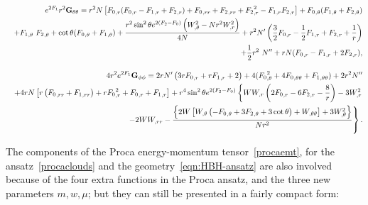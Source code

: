 \begin{eqnarray}
&&  e^{2F_1}r^2{\bf G_{\theta\theta}}=r^2 N\left[ {F_0}_{,r}({F_0}_{,r}- 
{F_1}_{,r}+{F_2}_{,r}) + {F_0}_{,rr}+
{F_2}_{,rr}+ {F_2}_{,r}^2-{F_1}_{,r} {F_2}_{,r} \right]
%
+{F_0}_{,\theta}( {F_1}_{,\theta}+ 
{F_2}_{,\theta})
%
 \nonumber \\
&&
+{F_1}_{,\theta} \
{F_2}_{,\theta}
+\cot \theta( {F_0}_{,\theta}+ {F_1}_{,\theta})+\frac{r^2 \sin ^2\theta 
 e^{2( {F_2}- {F_0})}\left(W_{,\theta}^2-Nr^2  W_{,r}^2\right)}{4 N}+r^2 N' \left(\frac{3}{2} {F_0}_{,r}-\frac{1}{2}  {F_1}_{,r}+
{F_2}_{,r}+\frac{1}{r}\right)
 \nonumber \\
&&
+\frac{1}{2} r^2 \
N''
+r N(
{F_0}_{,r}-
{F_1}_{,r}+2 {F_2}_{,r}),
\end{eqnarray}



\begin{eqnarray}
&& 4r^2e^{2F_1}{\bf G_{\phi\phi}}= 2 r N'  \left(3 r {F_0}_{,r}+r 
{F_1}_{,r}+2\right)+4 (
{F_0}_{,\theta}^2  +4{F_0}_{,\theta\theta}+ {F_1}_{,\theta\theta}) +2 r^2 N''  \nonumber \\
%
&& 
%
+4 r N  \left[r \left({F_0}_{,rr}+{F_1}_{,rr}\right)+r 
{F_0}_{,r}^2+{F_0}_{,r}+{F_1}_{,r}\right] +r^4 \sin ^2\theta e^{2 ({F_2}-F_0)}\left\{ W W_{,r}\left(2  {F_0}_{,r}-6 {F_2}_{,r}-\frac{8}{r}\right)-3  W_{,r}^2\right. \nonumber \\
%
&&
\left.-2 WW_{,rr}- \frac{\left\{2 W \left[W_{,\theta} \left(- {F_0}_{,\theta}
+3 {F_2}_{,\theta}+3 \cot \theta\right)+ W_{,\theta\theta}\right]+3 W_{,\theta}^2\right\}}{Nr^2}\right\} .
\end{eqnarray}






The components of the Proca energy-momentum tensor~\eqref{procaemt}, for the ansatz~\eqref{procaclouds} and the geometry~\eqref{eqn:HBH-ansatz} are also involved because of the four extra functions in the Proca ansatz, and the three new parameters $m,w,\mu$; but they can still be presented in a fairly compact form:

